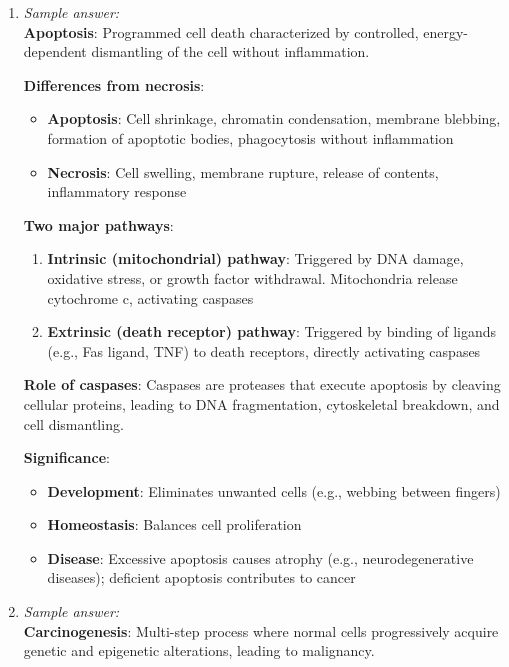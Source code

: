 \documentclass[11pt]{article}
\begin{document}
\begin{enumerate}[label=\textbf{\arabic*.}]
  Complications include myocardial infarction, stroke, and peripheral arterial disease.

  \item \emph{Sample answer:}\\
  \textbf{Apoptosis}: Programmed cell death characterized by controlled, energy-dependent dismantling 
  of the cell without inflammation.

  \textbf{Differences from necrosis}:
  \begin{itemize}
    \item \textbf{Apoptosis}: Cell shrinkage, chromatin condensation, membrane blebbing, formation 
    of apoptotic bodies, phagocytosis without inflammation
    \item \textbf{Necrosis}: Cell swelling, membrane rupture, release of contents, inflammatory response
  \end{itemize}

  \textbf{Two major pathways}:
  \begin{enumerate}
    \item \textbf{Intrinsic (mitochondrial) pathway}: Triggered by DNA damage, oxidative stress, 
    or growth factor withdrawal. Mitochondria release cytochrome c, activating caspases
    \item \textbf{Extrinsic (death receptor) pathway}: Triggered by binding of ligands (e.g., Fas 
    ligand, TNF) to death receptors, directly activating caspases
  \end{enumerate}

  \textbf{Role of caspases}: Caspases are proteases that execute apoptosis by cleaving cellular proteins, 
  leading to DNA fragmentation, cytoskeletal breakdown, and cell dismantling.

  \textbf{Significance}:
  \begin{itemize}
    \item \textbf{Development}: Eliminates unwanted cells (e.g., webbing between fingers)
    \item \textbf{Homeostasis}: Balances cell proliferation
    \item \textbf{Disease}: Excessive apoptosis causes atrophy (e.g., neurodegenerative diseases); 
    deficient apoptosis contributes to cancer
  \end{itemize}

  \item \emph{Sample answer:}\\
  \textbf{Carcinogenesis}: Multi-step process where normal cells progressively acquire genetic and 
  epigenetic alterations, leading to malignancy.


\end{enumerate}
\end{document}
